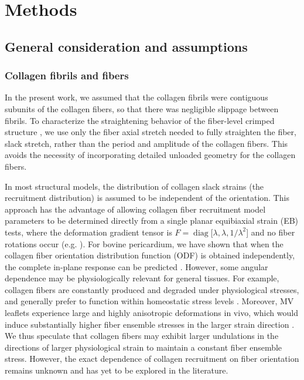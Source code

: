 \section{Methods}

\subsection{General consideration and assumptions}\label{sec:generalconsiderations}

\subsubsection{Collagen fibrils and fibers} \label{sec:collagenconsiderations}

    In the present work, we assumed that the collagen fibrils were contiguous subunits of the collagen fibers, so that there was negligible slippage between fibrils. To characterize the straightening behavior of the fiber-level crimped structure \cite{lanir_constitutive_1983, fata_insights_2014, sacks_incorporation_2003, lanir_structural_1979, kastelic_structural_1980, hansen_recruitment_2002, cacho_constitutive_2007, grytz_constitutive_2009}, we use only the fiber axial stretch needed to fully straighten the fiber, slack stretch, rather than the period and amplitude of the collagen fibers. This avoids the necessity of incorporating detailed unloaded geometry for the collagen fibers.


    In most structural models, the distribution of collagen slack strains (the recruitment distribution) is assumed to be independent of the orientation. This approach has the advantage of allowing collagen fiber recruitment model parameters to be determined directly from a single planar equibiaxial strain (EB) tests, where the deformation gradient tensor is $F = \operatorname{diag}[\lambda, \lambda, 1/\lambda^2$] and no fiber rotations occur (e.g. \cite{fata_insights_2014}). For bovine pericardium, we have shown that when the collagen fiber orientation distribution function (ODF) is obtained independently, the complete in-plane response can be predicted \cite{sacks_incorporation_2003}. However, some angular dependence may be physiologically relevant for general tissues. For example, collagen fibers are constantly produced and degraded under physiological stresses, and generally prefer to function within homeostatic stress levels \cite{humphrey_cardiovascular_2002}. Moreover, MV leaflets experience large and highly anisotropic deformations in vivo, which would induce substantially higher fiber ensemble stresses in the larger strain direction \cite{amini_vivo_2012,sacks_vivo_2006}. We thus speculate that collagen fibers may exhibit larger undulations in the directions of larger physiological strain to maintain a constant fiber ensemble stress. However, the exact dependence of collagen recruitment on fiber orientation remains unknown and has yet to be explored in the literature.

